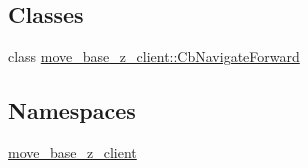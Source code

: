 \subsection*{Classes}
\begin{DoxyCompactItemize}
\item 
class \hyperlink{classmove__base__z__client_1_1CbNavigateForward}{move\+\_\+base\+\_\+z\+\_\+client\+::\+Cb\+Navigate\+Forward}
\end{DoxyCompactItemize}
\subsection*{Namespaces}
\begin{DoxyCompactItemize}
\item 
 \hyperlink{namespacemove__base__z__client}{move\+\_\+base\+\_\+z\+\_\+client}
\end{DoxyCompactItemize}
